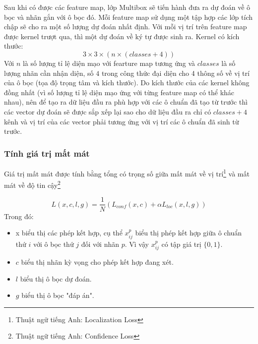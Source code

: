 \documentclass[a4paper,12pt]{article}
\begin{document}
	
	Sau khi có được các feature map, lớp Multibox sẽ tiến hành đưa ra dự đoán về ô bọc và nhãn gắn với ô bọc đó. Mỗi feature map sử dụng một tập hợp các lớp tích chập sẽ cho ra một số lượng dự đoán nhất định. Với mỗi vị trí trên feature map được kernel trượt qua, thì một dự đoán về ký tự được sinh ra. Kernel có kích thước:
	$$3 \times 3 \times (n \times (classes + 4))$$
	Với $n$ là số lượng tỉ lệ diện mạo với fearture map tương ứng và $classes$ là số lượng nhãn cần nhận diện, số $4$ trong công thức đại diện cho 4 thông số về vị trí của ô bọc (tọa độ trọng tâm và kích thước). Do kích thước của các kernel không đồng nhất (vì số lượng tỉ lệ diện mạo ứng với từng feature map có thể khác nhau), nên để tạo ra dữ liệu đầu ra phù hợp với các ô chuẩn đã tạo từ trước thì các vector dự đoán sẽ được sắp xếp lại sao cho dữ liệu đầu ra chỉ có $classes + 4$ kênh và vị trí của các vector phải tương ứng với vị trí các ô chuẩn đã sinh từ trước.
	
	\subsubsection{Tính giá trị mất mát}
	
	Giá trị mất mát được tính bằng tổng có trọng số giữa mất mát về vị trí\footnote{Thuật ngữ tiếng Anh: Localization Loss} và mất mát về độ tin cậy\footnote{Thuật ngữ tiếng Anh: Confidence Loss}
	
	$$ L(x,c,l,g) = \frac{1}{N} (L_{conf}(x,c) + \alpha L_{loc}(x,l,g) ) $$
	Trong đó:
	\begin{itemize}
		\item x biểu thị các phép kết hợp, cụ thể $x^p_{ij}$ biểu thị phép kết hợp giữa ô chuẩn thứ $i$ với ô bọc thứ $j$ đối với nhãn $p$. Vì vậy $x^p_{ij}$ có tập giá trị $\{0, 1\}$.
		\item $c$ biểu thị nhãn kỳ vọng cho phép kết hợp đang xét.
		\item $l$ biểu thị ô bọc dự đoán.
		\item $g$ biểu thị ô bọc "đáp án".
	\end{itemize}
	
\end{document}
